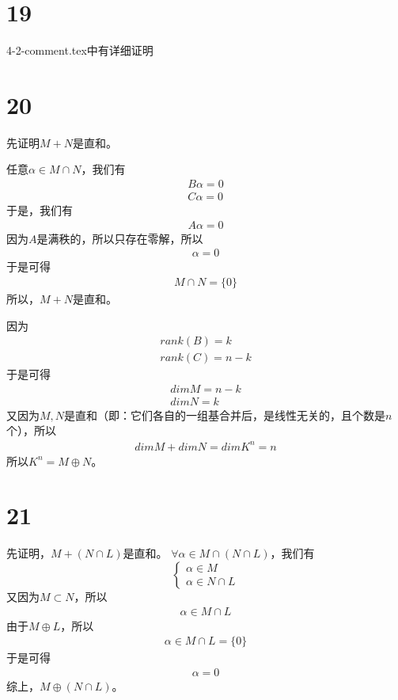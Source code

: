 \documentclass{article}
\begin{document}
\section*{19}

4-2-comment.tex中有详细证明

\section*{20}

先证明$M + N$是直和。

任意$\alpha \in M \cap N$，我们有
\begin{align*}
  B \alpha = 0 \\
  C \alpha = 0
\end{align*}
于是，我们有
\begin{align*}
  A \alpha = 0
\end{align*}
因为$A$是满秩的，所以只存在零解，所以
\begin{align*}
  \alpha = 0
\end{align*}
于是可得
\begin{align*}
  M \cap N = \{0\}
\end{align*}
所以，$M + N$是直和。

因为
\begin{align*}
  rank(B) = k \\
  rank(C) = n - k
\end{align*}
于是可得
\begin{align*}
  dim M = n - k \\
  dim N = k
\end{align*}
又因为$M, N$是直和（即：它们各自的一组基合并后，是线性无关的，且个数是$n$个），所以
\begin{align*}
  dim M + dim N = dim K^n = n
\end{align*}
所以$K^n = M \oplus N$。

\section*{21}

先证明，$M + (N \cap L)$是直和。
$\forall \alpha \in M \cap (N \cap L)$，我们有
\begin{equation*}
  \begin{cases*}
    \alpha \in M \\
    \alpha \in N \cap L
  \end{cases*}
\end{equation*}
又因为$M \subset N$，所以
\begin{align*}
  \alpha \in M \cap L
\end{align*}
由于$M \oplus L$，所以
\begin{align*}
  \alpha \in M \cap L = \{0\}
\end{align*}
于是可得
\begin{align*}
  \alpha = 0
\end{align*}
综上，$M \oplus (N \cap L)$。
\end{document}
